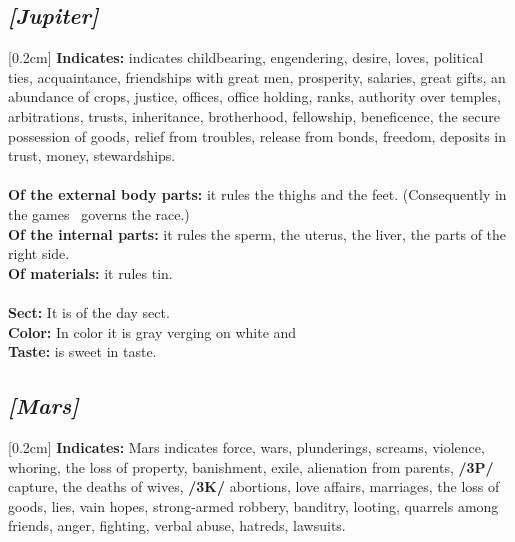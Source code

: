 \secbr
\subsection{\textit{[Jupiter]}}
[0.2cm]
\noindent
\textbf{Indicates:} \Jupiter{} indicates childbearing, engendering, desire, loves, political ties, acquaintance, friendships with great men, prosperity, salaries, great gifts, an abundance of crops, justice, offices, office holding, ranks, authority over temples, arbitrations, trusts, inheritance, brotherhood, fellowship, beneficence, the secure possession of goods, relief from troubles, release from bonds, freedom, deposits in trust, money, stewardships. \\
\\
\textbf{Of the external body parts:} it rules the thighs and the feet. (Consequently in the games \Jupiter\, governs the race.)\\
\textbf{Of the internal parts:}  it rules the sperm, the uterus, the liver, the parts of the right side. \\
\textbf{Of materials:} it rules tin. \\
\\
\textbf{Sect:} It is of the day sect. \\
\textbf{Color:} In color it is gray verging on white and \\
\textbf{Taste:} is sweet in taste.

\secbr
\subsection{\textit{[Mars]}}
[0.2cm]
\noindent
\textbf{Indicates:}  Mars indicates force, wars, plunderings, screams, violence, whoring, the loss of property, banishment,
exile, alienation from parents, \textbf{/3P/} capture, the deaths of wives, \textbf{/3K/} abortions, love affairs, marriages, the loss of goods, lies, vain hopes, strong-armed robbery, banditry, looting, quarrels among friends, anger,
fighting, verbal abuse, hatreds, lawsuits. 

